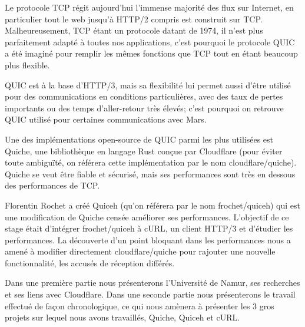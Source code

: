 Le protocole TCP régit aujourd'hui l'immense majorité des flux sur Internet, en particulier tout le web jusqu'à HTTP/2 compris est construit sur TCP.
Malheureusement, TCP étant un protocole datant de 1974, il n'est plus parfaitement adapté à toutes nos applications, c'est pourquoi le protocole QUIC a été imaginé pour remplir les mêmes fonctions que TCP tout en étant beaucoup plus flexible.

QUIC est à la base d'HTTP/3, mais sa flexibilité lui permet aussi d'être utilisé pour des communications en conditions particulières, avec des taux de pertes importants ou des temps d'aller-retour très élevés; c'est pourquoi on retrouve QUIC utilisé pour certaines communications avec Mars.

Une des implémentations open-source de QUIC parmi les plus utilisées est Quiche, une bibliothèque en langage Rust conçue par Cloudflare (pour éviter toute ambiguïté, on référera cette implémentation par le nom cloudflare/quiche). Quiche se veut être fiable et sécurisé, mais ses performances sont très en dessous des performances de TCP.

Florentin Rochet a créé Quiceh (qu'on référera par le nom frochet/quiceh) qui est une modification de Quiche censée améliorer ses performances. L'objectif de ce stage était d'intégrer frochet/quiceh à cURL, un client HTTP/3 et d'étudier les performances. La découverte d'un point bloquant dans les performances nous a amené à modifier directement cloudflare/quiche pour rajouter une nouvelle fonctionnalité, les accusés de réception différés.

\vspace{0.5cm}

Dans une première partie nous présenterons l'Université de Namur, ses recherches et ses liens avec Cloudflare. Dans une seconde partie nous présenterons le travail effectué de façon chronologique, ce qui nous amènera à présenter les 3 gros projets sur lequel nous avons travaillés, Quiche, Quiceh et cURL.